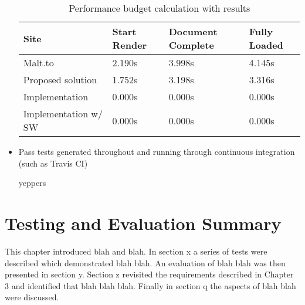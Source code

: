 \begin{itemize}
    \begin{table}[H]
    \centering
    \begin{tabular}{|l|l|l|l|}
    \hline
    \textbf{Site}     & \textbf{Start Render} & \textbf{Document Complete} & \textbf{Fully Loaded} \\ \hline
    Malt.to           & 2.190s                & 3.998s                     & 4.145s                \\ \hline
    Proposed solution & 1.752s                & 3.198s                     & 3.316s                \\ \hline
    Implementation & 0.000s                & 0.000s                     & 0.000s                \\ \hline
    Implementation w/ SW & 0.000s                & 0.000s                     & 0.000s                \\ \hline
    \end{tabular}
    \caption{Performance budget calculation with results}
    \label{table-performance-budget-results}
    \end{table}

  \item Pass tests generated throughout and running through continuous integration (such as Travis CI)

    yeppers

\end{itemize}

\section{Testing and Evaluation Summary} \label{s-i--testing-and-evaluation-summary}

This chapter introduced blah and blah.  In section x a series of tests were described which demonstrated blah blah.
An evaluation of blah blah was then presented in section y.  Section z revisited the requirements described in Chapter 3 and identified that blah blah blah. Finally in section q the aspects of blah blah were discussed.
